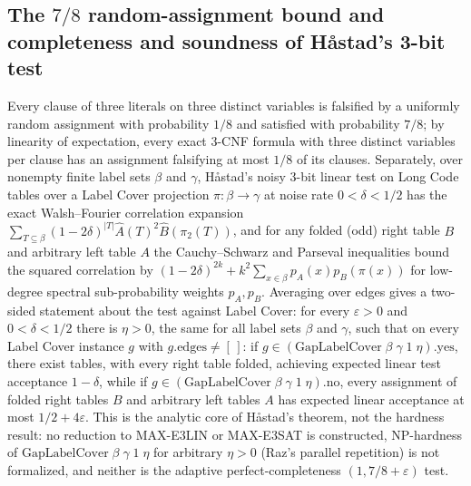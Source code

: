 \begin{result}
\subsection{The $7/8$ random-assignment bound and completeness and soundness of H\r{a}stad's 3-bit test}
Every clause of three literals on three distinct variables is falsified by a
uniformly random assignment with probability $1/8$ and satisfied with probability
$7/8$; by linearity of expectation, every exact 3-CNF formula with three distinct
variables per clause has an assignment falsifying at most $1/8$ of its clauses.
Separately, over nonempty finite label sets $\beta$
and $\gamma$, H\r{a}stad's noisy 3-bit linear test on Long Code tables over a Label
Cover projection $\pi\colon\beta\to\gamma$ at noise rate $0<\delta<1/2$ has the exact
Walsh--Fourier correlation expansion
$\sum_{T\subseteq\beta}(1-2\delta)^{|T|}\widehat{A}(T)^2\widehat{B}(\pi_2(T))$, and for
any folded (odd) right table $B$ and arbitrary left table $A$ the Cauchy--Schwarz and
Parseval inequalities bound the squared correlation by
$(1-2\delta)^{2k}+k^2\sum_{x\in\beta}p_A(x)p_B(\pi(x))$ for low-degree spectral
sub-probability weights $p_A,p_B$. Averaging over edges gives a two-sided
statement about the test against Label Cover: for every $\varepsilon>0$ and
$0<\delta<1/2$ there is $\eta>0$, the same for all label sets $\beta$ and $\gamma$, such
that on every Label Cover instance $g$ with
$g.\mathrm{edges}\neq[\,]$: if $g\in(\mathrm{GapLabelCover}\;\beta\;\gamma\;1\;\eta).\mathrm{yes}$,
there exist tables, with every right table folded, achieving expected linear test acceptance
$1-\delta$, while if $g\in(\mathrm{GapLabelCover}\;\beta\;\gamma\;1\;\eta).\mathrm{no}$,
every assignment of folded right tables $B$ and arbitrary left tables $A$ has expected
linear acceptance at most $1/2+4\varepsilon$. This is the analytic core of
H\r{a}stad's theorem, not the hardness result: no reduction to MAX-E3LIN or
MAX-E3SAT is constructed, NP-hardness of $\mathrm{GapLabelCover}\;\beta\;\gamma\;1\;\eta$ for
arbitrary $\eta>0$ (Raz's parallel repetition) is not formalized, and neither is the
adaptive perfect-completeness $(1,7/8+\varepsilon)$ test.\citep{Hastad2001}\citep[Chapter 22]{AroraBarak09}
\end{result}


